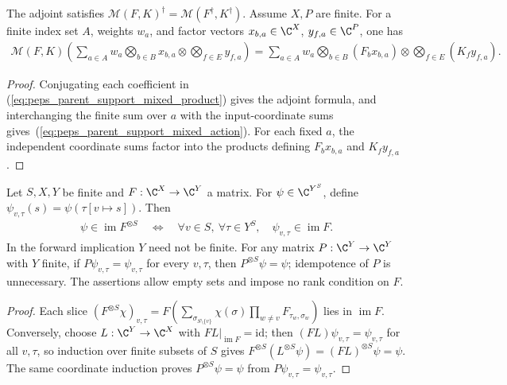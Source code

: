 \begin{lemma}%
    \label{thm:peps_parent_support_mixed_action}
    \leanok
    The adjoint satisfies
    $\mathcal M(F,K)^\dagger=\mathcal M(F^\dagger,K^\dagger)$.
    Assume $X,P$ are finite. For a finite index set $A$, weights $w_a$, and factor vectors
    $x_{b,a}\in\C^X$, $y_{f,a}\in\C^P$, one has
    \begin{align}
        \mathcal M(F,K)
        \left(\sum_{a\in A}w_a
        \bigotimes_{b\in B}x_{b,a}\otimes
        \bigotimes_{f\in E}y_{f,a}\right)
        =\sum_{a\in A}w_a
        \bigotimes_{b\in B}(F_bx_{b,a})\otimes
        \bigotimes_{f\in E}(K_fy_{f,a}).
        \label{eq:peps_parent_support_mixed_action}
    \end{align}
\end{lemma}
\begin{proof}\leanok
    Conjugating each coefficient in
    (\ref{eq:peps_parent_support_mixed_product}) gives the adjoint
    formula, and interchanging
    the finite sum over $a$ with the input-coordinate sums gives~(\ref{eq:peps_parent_support_mixed_action}). For each
    fixed $a$, the independent coordinate sums factor into the products
    defining $F_bx_{b,a}$ and $K_fy_{f,a}$.
\end{proof}

\begin{lemma}%
    \label{thm:peps_parent_support_product_range}
    \leanok
    Let $S,X,Y$ be finite and $F:\C^X\to\C^Y$ a matrix. For
    $\psi\in\C^{Y^S}$, define
    $\psi_{v,\tau}(s)=\psi(\tau[v\mapsto s])$. Then
    \begin{align}
        \psi\in\operatorname{im}F^{\otimes S}
        \quad\Longleftrightarrow\quad
        \forall v\in S,\ \forall\tau\in Y^S,\quad
        \psi_{v,\tau}\in\operatorname{im}F.
        \label{eq:peps_parent_support_product_range}
    \end{align}
    In the forward implication $Y$ need not be finite.
    For any matrix $P:\C^Y\to\C^Y$ with $Y$ finite, if
    $P\psi_{v,\tau}=\psi_{v,\tau}$ for every $v,\tau$, then
    $P^{\otimes S}\psi=\psi$; idempotence of $P$ is unnecessary.
    The assertions allow empty sets and impose no rank condition on $F$.
\end{lemma}
\begin{proof}\leanok
    Each slice $(F^{\otimes S}\chi)_{v,\tau}=F(\sum_{\sigma_{S\setminus\{v\}}}\chi(\sigma)\prod_{w\ne v}F_{\tau_w,\sigma_w})$
    lies in $\operatorname{im}F$. Conversely, choose $L:\C^Y\to\C^X$ with
    $FL|_{\operatorname{im}F}=\mathrm{id}$; then $(FL)\psi_{v,\tau}=\psi_{v,\tau}$
    for all $v,\tau$, so induction over finite subsets of $S$ gives
    $F^{\otimes S}(L^{\otimes S}\psi)=(FL)^{\otimes S}\psi=\psi$. The same
    coordinate induction proves $P^{\otimes S}\psi=\psi$ from
    $P\psi_{v,\tau}=\psi_{v,\tau}$.
\end{proof}

